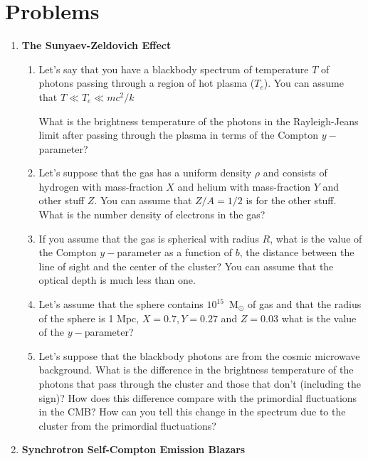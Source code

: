 \section{Problems}
\begin{enumerate}

\item{\bf The Sunyaev-Zeldovich Effect}

\begin{enumerate}
\item Let's say that you have a blackbody spectrum of temperature $T$
  of photons passing through a region of hot plasma ($T_e$).   You can assume
  that $T \ll T_e \ll m c^2/k$ 

  What is the brightness temperature of the photons in the
  Rayleigh-Jeans limit after passing through the plasma in terms of
  the Compton $y-$parameter?
\item Let's suppose that the gas has a uniform density $\rho$ and
  consists of hydrogen with mass-fraction $X$ and helium with
  mass-fraction $Y$ and other stuff $Z$.  You can assume that
  $Z/A=1/2$ is for the other stuff.  What is the number density of
  electrons in the gas?
\item
  If you assume that the gas is spherical with radius $R$, what is the
  value of the Compton $y-$parameter as a function of $b$, the
  distance between the line of sight and the center of the cluster?
  You can assume that the optical depth is much less than one.
\item 
  Let's assume that the sphere contains $10^{15}$~M$_\odot$ of gas and
  that the radius of the sphere is 1 Mpc, $X=0.7, Y=0.27$ and
  $Z=0.03$ what is the value of the $y-$parameter?
\item
  Let's suppose that the blackbody photons are from the cosmic
  microwave background.   What is the difference in the brightness 
  temperature of the photons that pass through the cluster and those
  that don't (including the sign)?   How does this difference compare
  with the primordial fluctuations in the CMB?  How can you tell this
  change in the spectrum due to the cluster from the primordial
  fluctuations? 
\end{enumerate}

\item{\bf Synchrotron Self-Compton Emission Blazars}


\end{enumerate}
